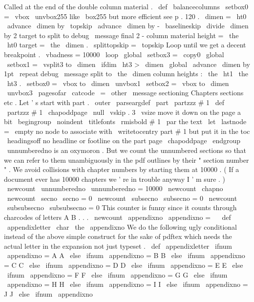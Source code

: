 {{{{%
%
Called
at
the
end
of
the
double
column
material
.
\
def
\
balancecolumns
{
%
\
setbox0
=
\
vbox
{
\
unvbox255
}
%
like
\
box255
but
more
efficient
see
p
.
120
.
\
dimen
=
\
ht0
\
advance
\
dimen
by
\
topskip
\
advance
\
dimen
by
-
\
baselineskip
\
divide
\
dimen
by
2
%
target
to
split
to
%
debug
\
message
{
final
2
-
column
material
height
=
\
the
\
ht0
target
=
\
the
\
dimen
.
}
%
\
splittopskip
=
\
topskip
%
Loop
until
we
get
a
decent
breakpoint
.
{
%
\
vbadness
=
10000
\
loop
\
global
\
setbox3
=
\
copy0
\
global
\
setbox1
=
\
vsplit3
to
\
dimen
\
ifdim
\
ht3
>
\
dimen
\
global
\
advance
\
dimen
by
1pt
\
repeat
}
%
%
debug
\
message
{
split
to
\
the
\
dimen
column
heights
:
\
the
\
ht1
\
the
\
ht3
.
}
%
\
setbox0
=
\
vbox
to
\
dimen
{
\
unvbox1
}
%
\
setbox2
=
\
vbox
to
\
dimen
{
\
unvbox3
}
%
%
\
pagesofar
}
\
catcode
\
=
\
other
\
message
{
sectioning
}
%
Chapters
sections
etc
.
%
Let
'
s
start
with
part
.
\
outer
\
parseargdef
\
part
{
\
partzzz
{
#
1
}
}
\
def
\
partzzz
#
1
{
%
\
chapoddpage
\
null
\
vskip
.
3
\
vsize
%
move
it
down
on
the
page
a
bit
\
begingroup
\
noindent
\
titlefonts
\
rmisbold
#
1
\
par
%
the
text
\
let
\
lastnode
=
\
empty
%
no
node
to
associate
with
\
writetocentry
{
part
}
{
#
1
}
{
}
%
but
put
it
in
the
toc
\
headingsoff
%
no
headline
or
footline
on
the
part
page
\
chapoddpage
\
endgroup
}
%
\
unnumberedno
is
an
oxymoron
.
But
we
count
the
unnumbered
%
sections
so
that
we
can
refer
to
them
unambiguously
in
the
pdf
%
outlines
by
their
"
section
number
"
.
We
avoid
collisions
with
chapter
%
numbers
by
starting
them
at
10000
.
(
If
a
document
ever
has
10000
%
chapters
we
'
re
in
trouble
anyway
I
'
m
sure
.
)
\
newcount
\
unnumberedno
\
unnumberedno
=
10000
\
newcount
\
chapno
\
newcount
\
secno
\
secno
=
0
\
newcount
\
subsecno
\
subsecno
=
0
\
newcount
\
subsubsecno
\
subsubsecno
=
0
%
This
counter
is
funny
since
it
counts
through
charcodes
of
letters
A
B
.
.
.
\
newcount
\
appendixno
\
appendixno
=
\
%
%
\
def
\
appendixletter
{
\
char
\
the
\
appendixno
}
%
We
do
the
following
ugly
conditional
instead
of
the
above
simple
%
construct
for
the
sake
of
pdftex
which
needs
the
actual
%
letter
in
the
expansion
not
just
typeset
.
%
\
def
\
appendixletter
{
%
\
ifnum
\
appendixno
=
A
A
%
\
else
\
ifnum
\
appendixno
=
B
B
%
\
else
\
ifnum
\
appendixno
=
C
C
%
\
else
\
ifnum
\
appendixno
=
D
D
%
\
else
\
ifnum
\
appendixno
=
E
E
%
\
else
\
ifnum
\
appendixno
=
F
F
%
\
else
\
ifnum
\
appendixno
=
G
G
%
\
else
\
ifnum
\
appendixno
=
H
H
%
\
else
\
ifnum
\
appendixno
=
I
I
%
\
else
\
ifnum
\
appendixno
=
J
J
%
\
else
\
ifnum
\
appendixno
}}}}}
